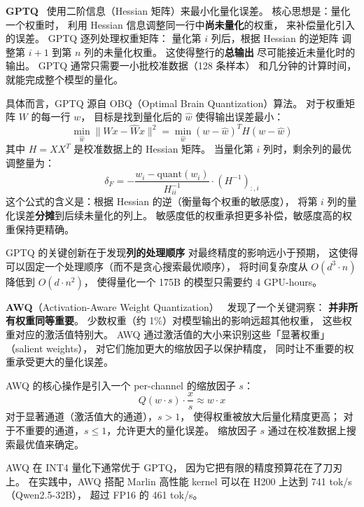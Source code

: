 \textbf{GPTQ}~\cite{frantar2022gptq} 使用二阶信息（Hessian 矩阵）来最小化量化误差。
核心思想是：量化一个权重时，
利用 Hessian 信息调整同一行中\textbf{尚未量化}的权重，
来补偿量化引入的误差。
GPTQ 逐列处理权重矩阵：
量化第 $i$ 列后，根据 Hessian 的逆矩阵
调整第 $i+1$ 到第 $n$ 列的未量化权重。
这使得整行的\textbf{总输出}
尽可能接近未量化时的输出。
GPTQ 通常只需要一小批校准数据（128 条样本）
和几分钟的计算时间，就能完成整个模型的量化。

具体而言，GPTQ 源自 OBQ（Optimal Brain Quantization）算法。
对于权重矩阵 $W$ 的每一行 $w$，
目标是找到量化后的 $\hat{w}$ 使得输出误差最小：
\begin{equation}
  \min_{\hat{w}} \| W x - \hat{W} x \|^2
  = \min_{\hat{w}} (w - \hat{w})^T H (w - \hat{w})
\end{equation}
其中 $H = X X^T$ 是校准数据上的 Hessian 矩阵。
当量化第 $i$ 列时，剩余列的最优调整量为：
\begin{equation}
  \delta_F = -\frac{w_i - \mathrm{quant}(w_i)}{H_{ii}^{-1}} \cdot (H^{-1})_{:,i}
\end{equation}
这个公式的含义是：根据 Hessian 的逆（衡量每个权重的敏感度），
将第 $i$ 列的量化误差\textbf{分摊}到后续未量化的列上。
敏感度低的权重承担更多补偿，敏感度高的权重保持更精确。

GPTQ 的关键创新在于发现\textbf{列的处理顺序}
对最终精度的影响远小于预期，
这使得可以固定一个处理顺序（而不是贪心搜索最优顺序），
将时间复杂度从 $O(d^3 \cdot n)$ 降低到 $O(d \cdot n^2)$，
使得量化一个 175B 的模型只需要约 4 GPU-hours。

\textbf{AWQ}（Activation-Aware Weight Quantization）~\cite{lin2024awq}
发现了一个关键洞察：
\textbf{并非所有权重同等重要}。
少数权重（约 1\%）对模型输出的影响远超其他权重，
这些权重对应的激活值特别大。
AWQ 通过激活值的大小来识别这些「显著权重」（salient weights），
对它们施加更大的缩放因子以保护精度，
同时让不重要的权重承受更大的量化误差。

AWQ 的核心操作是引入一个 per-channel 的缩放因子 $s$：
\begin{equation}
  Q(w \cdot s) \cdot \frac{x}{s} \approx w \cdot x
\end{equation}
对于显著通道（激活值大的通道），$s > 1$，
使得权重被放大后量化精度更高；
对于不重要的通道，$s \leq 1$，允许更大的量化误差。
缩放因子 $s$ 通过在校准数据上搜索最优值来确定。

AWQ 在 INT4 量化下通常优于 GPTQ，
因为它把有限的精度预算花在了刀刃上。
在实践中，AWQ 搭配 Marlin 高性能 kernel
可以在 H200 上达到 741 tok/s（Qwen2.5-32B），
超过 FP16 的 461 tok/s。


